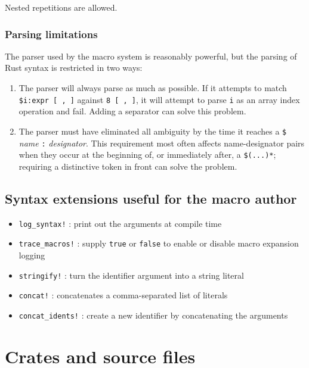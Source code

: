 \documentclass[]{article}
\begin{document}
Nested repetitions are allowed.

\subsubsection{Parsing limitations}\label{parsing-limitations}

The parser used by the macro system is reasonably powerful, but the
parsing of Rust syntax is restricted in two ways:

\begin{enumerate}
\def\labelenumi{\arabic{enumi}.}
\itemsep1pt\parskip0pt
\item
  The parser will always parse as much as possible. If it attempts to
  match \texttt{\$i:expr {[} , {]}} against \texttt{8 {[} , {]}}, it
  will attempt to parse \texttt{i} as an array index operation and fail.
  Adding a separator can solve this problem.
\item
  The parser must have eliminated all ambiguity by the time it reaches a
  \texttt{\$} \emph{name} \texttt{:} \emph{designator}. This requirement
  most often affects name-designator pairs when they occur at the
  beginning of, or immediately after, a \texttt{\$(...)*}; requiring a
  distinctive token in front can solve the problem.
\end{enumerate}

\subsection{Syntax extensions useful for the macro
author}\label{syntax-extensions-useful-for-the-macro-author}

\begin{itemize}
\itemsep1pt\parskip0pt
\item
  \texttt{log\_syntax!} : print out the arguments at compile time
\item
  \texttt{trace\_macros!} : supply \texttt{true} or \texttt{false} to
  enable or disable macro expansion logging
\item
  \texttt{stringify!} : turn the identifier argument into a string
  literal
\item
  \texttt{concat!} : concatenates a comma-separated list of literals
\item
  \texttt{concat\_idents!} : create a new identifier by concatenating
  the arguments
\end{itemize}

\section{Crates and source files}\label{crates-and-source-files}
\end{document}
